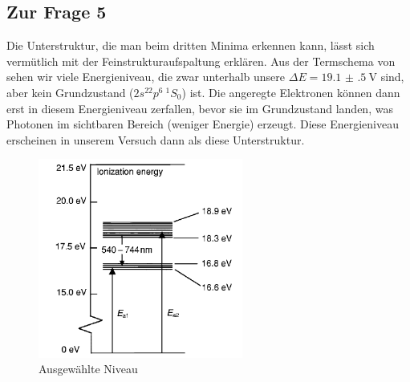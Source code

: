



	\subsection{Zur Frage 5}
		Die Unterstruktur, die man beim dritten Minima erkennen kann, lässt sich vermütlich mit der Feinstrukturaufspaltung erklären. Aus der Termschema von  sehen wir viele Energieniveau, die zwar unterhalb unsere $\Delta E = \SI{19.1(5)}{\volt}$ sind, aber kein Grundzustand ($2s^22p^6~^1\!S_0$) ist. Die angeregte Elektronen können dann erst in diesem Energieniveau zerfallen, bevor sie im Grundzustand landen, was Photonen im sichtbaren Bereich (weniger Energie) erzeugt. Diese Energieniveau erscheinen in unserem Versuch dann als diese Unterstruktur. 
		\begin{figure}[!ht]
		    \centering
		    \includegraphics[width=0.6\textwidth]{images/neon-levels.jpg}
		    \caption{Ausgewählte  Niveau \citep{rapior_new_2006}}
		    \label{fig:neon-levels}
		\end{figure}

